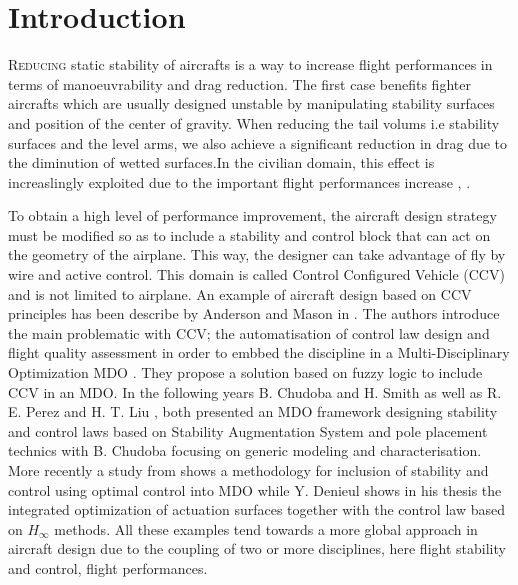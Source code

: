  \section{Introduction}
\lettrine{R}{educing} static stability of aircrafts is a way to increase flight performances in terms of manoeuvrability and drag reduction. The first case benefits fighter aircrafts which are usually designed unstable by manipulating stability surfaces and position of the center of gravity. When reducing the tail volums i.e stability surfaces and the level arms, we also achieve a significant reduction in drag due to the diminution of wetted surfaces.In the civilian domain, this effect is increaslingly exploited due to the important flight performances increase \cite{HermanImpactControlConceptonDesign}, \cite{Abzug}.

To obtain a high level of performance improvement, the aircraft design strategy must be modified so as to include a stability and control block that can act on the geometry of the airplane. This way, the designer can take advantage of fly by wire and active control. This domain is called Control Configured Vehicle (CCV) and is not limited to airplane\cite{Abzug}. An example of aircraft design based on CCV principles has been describe by Anderson and Mason in \cite{Anderson_CCV_design}. The authors introduce the main problematic with CCV; the automatisation of control law design and flight quality assessment in order to embbed the discipline in a Multi-Disciplinary Optimization MDO . They propose a solution based on fuzzy logic to include CCV in an MDO. In the following years B. Chudoba and H. Smith \cite{Chudoba_generic_method} as well as R. E. Perez and H. T. Liu \cite{LiuPerezMDOFramework}, both presented an MDO framework designing stability and control laws based on Stability Augmentation System and pole placement technics with B. Chudoba focusing on generic modeling and characterisation. More recently a study from \cite{WelsteadConceptualDesignAugmentedStability} shows a methodology for inclusion of stability and control using optimal control into MDO while Y. Denieul \cite{YannDenieul} shows in his thesis the integrated optimization of actuation surfaces together with the control law based on $H_\infty$ methods. All these examples tend towards a more global approach in aircraft design due to the coupling of two or more disciplines, here flight stability and control, flight performances.

